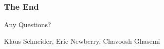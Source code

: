 \begin{frame}
	\frametitle{The End}
	\vspace{2cm}
	{\huge Any Questions?
	}
	\vspace{2.5cm}  
	\begin{flushright}  
		Klaus Schneider, Eric Newberry, Chavoosh Ghasemi \\
	\end{flushright}
\end{frame}
